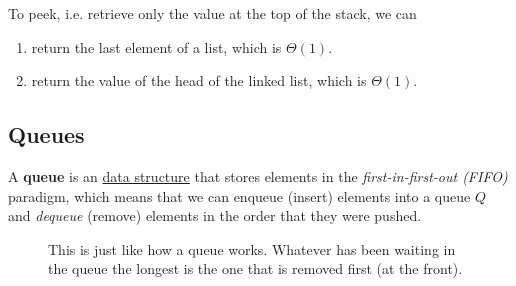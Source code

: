   \begin{algo}
    To peek, i.e. retrieve only the value at the top of the stack, we can 
    \begin{enumerate}
      \item return the last element of a list, which is $\Theta(1)$. 
      \item return the value of the head of the linked list, which is $\Theta(1)$. 
    \end{enumerate}
  \end{algo}

\subsection{Queues}

  \begin{definition}[Queue]
    \label{def:queue}
    A \textbf{queue} is an \hyperref[def:data-structure]{data structure} that stores elements in the \textit{first-in-first-out (FIFO)} paradigm, which means that we can enqueue (insert) elements into a queue $Q$ and \textit{dequeue} (remove) elements in the order that they were pushed. 

    \begin{figure}[H]
      \centering 
      \caption{This is just like how a queue works. Whatever has been waiting in the queue the longest is the one that is removed first (at the front).} 
      \label{fig:queue}
    \end{figure}
  \end{definition} 

